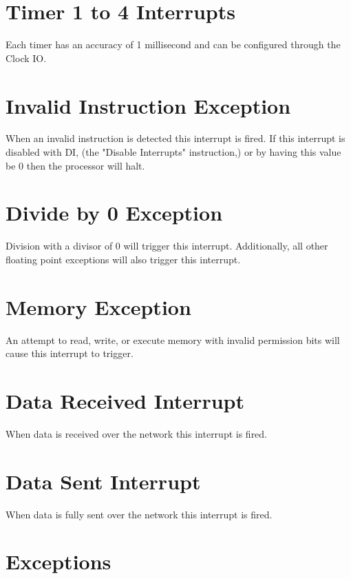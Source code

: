 \section{Timer 1 to 4 Interrupts}

Each timer has an accuracy of 1 millisecond and can be configured through the Clock IO.




\section{Invalid Instruction Exception}

When an invalid instruction is detected this interrupt is fired. If this interrupt is disabled with DI, (the "Disable Interrupts" instruction,) or by having this value be 0 then the processor will halt.




\section{Divide by 0 Exception}

Division with a divisor of 0 will trigger this interrupt. Additionally, all other floating point exceptions will also trigger this interrupt.




\section{Memory Exception}

An attempt to read, write, or execute memory with invalid permission bits will cause this interrupt to trigger.




\section{Data Received Interrupt}

When data is received over the network this interrupt is fired.




\section{Data Sent Interrupt}

When data is fully sent over the network this interrupt is fired.




\section{Exceptions}

